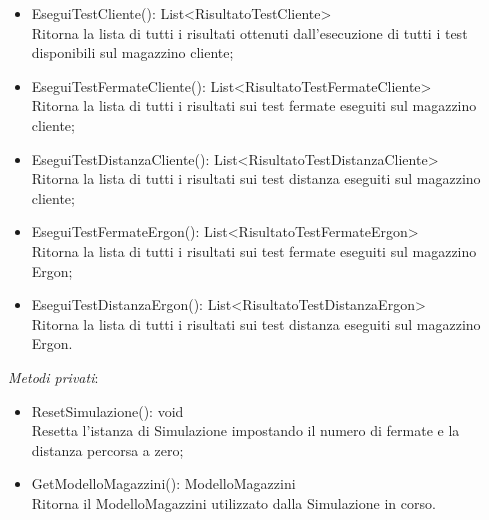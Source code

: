 \begin{itemize}
    \item EseguiTestCliente(): List<RisultatoTestCliente>\\
    Ritorna la lista di tutti i risultati ottenuti dall'esecuzione di tutti i test disponibili sul magazzino cliente;
    \item EseguiTestFermateCliente(): List<RisultatoTestFermateCliente>\\
    Ritorna la lista di tutti i risultati sui test fermate eseguiti sul magazzino cliente;
    \item EseguiTestDistanzaCliente(): List<RisultatoTestDistanzaCliente>\\
    Ritorna la lista di tutti i risultati sui test distanza eseguiti sul magazzino cliente;
    \item EseguiTestFermateErgon(): List<RisultatoTestFermateErgon>\\
    Ritorna la lista di tutti i risultati sui test fermate eseguiti sul magazzino Ergon;
    \item EseguiTestDistanzaErgon(): List<RisultatoTestDistanzaErgon>\\
    Ritorna la lista di tutti i risultati sui test distanza eseguiti sul magazzino Ergon.\\
\end{itemize} 
\textit{Metodi privati}:\\
\begin{itemize}
\item ResetSimulazione(): void \\
Resetta l'istanza di Simulazione impostando il numero di fermate e la distanza percorsa a zero;
\item GetModelloMagazzini(): ModelloMagazzini \\
Ritorna il ModelloMagazzini utilizzato dalla Simulazione in corso.\\
\end{itemize}

